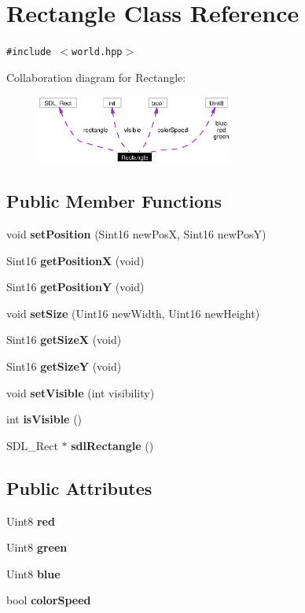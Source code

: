\section{Rectangle Class Reference}
\label{classRectangle}
{\tt \#include $<$world.hpp$>$}

Collaboration diagram for Rectangle:\begin{figure}[H]
\begin{center}
\leavevmode
\includegraphics[width=184pt]{classRectangle__coll__graph}
\end{center}
\end{figure}
\subsection*{Public Member Functions}
\begin{CompactItemize}
\item 
void {\bf set\-Position} (Sint16 new\-Pos\-X, Sint16 new\-Pos\-Y)
\item 
Sint16 {\bf get\-Position\-X} (void)
\item 
Sint16 {\bf get\-Position\-Y} (void)
\item 
void {\bf set\-Size} (Uint16 new\-Width, Uint16 new\-Height)
\item 
Sint16 {\bf get\-Size\-X} (void)
\item 
Sint16 {\bf get\-Size\-Y} (void)
\item 
void {\bf set\-Visible} (int visibility)
\item 
int {\bf is\-Visible} ()
\item 
SDL\_\-Rect $\ast$ {\bf sdl\-Rectangle} ()
\end{CompactItemize}
\subsection*{Public Attributes}
\begin{CompactItemize}
\item 
Uint8 {\bf red}
\item 
Uint8 {\bf green}
\item 
Uint8 {\bf blue}
\item 
bool {\bf color\-Speed}
\end{CompactItemize}
